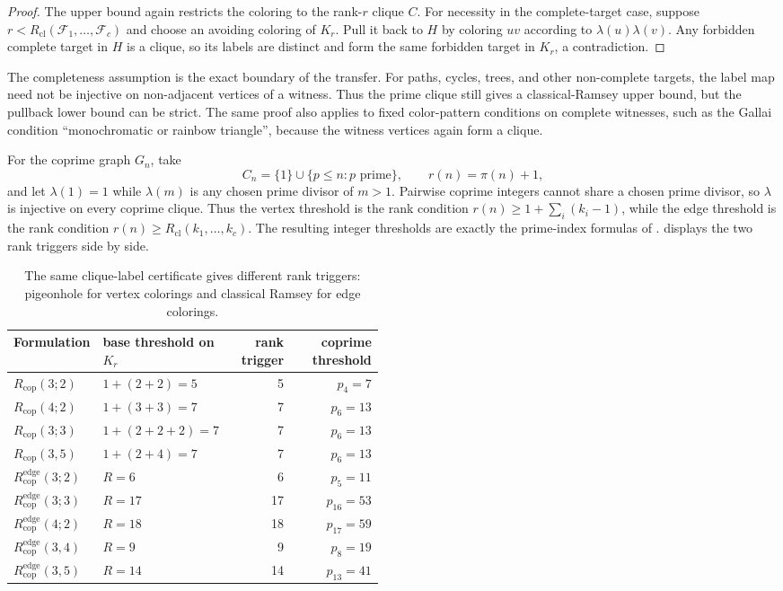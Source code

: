 \documentclass[11pt]{article}
\theoremstyle{plain}
\theoremstyle{definition}
\theoremstyle{remark}
\newcommand{\Rcop}{R_{\mathrm{cop}}}
\newcommand{\Redge}{R_{\mathrm{cop}}^{\mathrm{edge}}}
\newcommand{\Rcl}{R_{\mathrm{cl}}}
\begin{document}
\begin{proof}
The upper bound again restricts the coloring to the rank-$r$ clique $C$.
For necessity in the complete-target case, suppose
$r<R_{\mathrm{cl}}(\mathcal F_1,\ldots,\mathcal F_c)$ and choose an avoiding
coloring of $K_r$.  Pull it back to $H$ by coloring $uv$ according to
$\lambda(u)\lambda(v)$.  Any forbidden complete target in $H$ is a clique,
so its labels are distinct and form the same forbidden target in $K_r$,
a contradiction.
\end{proof}

The completeness assumption is the exact boundary of the transfer.  For
paths, cycles, trees, and other non-complete targets, the label map need not
be injective on non-adjacent vertices of a witness.  Thus the prime clique
still gives a classical-Ramsey upper bound, but the pullback lower bound can
be strict.  The same proof also applies to fixed color-pattern conditions on
complete witnesses, such as the Gallai condition ``monochromatic or rainbow
triangle'', because the witness vertices again form a clique.

For the coprime graph $G_n$, take
\[
  C_n=\{1\}\cup\{p\le n:p\text{ prime}\},\qquad r(n)=\pi(n)+1,
\]
and let $\lambda(1)=1$ while $\lambda(m)$ is any chosen prime divisor of
$m>1$.  Pairwise coprime integers cannot share a chosen prime divisor, so
$\lambda$ is injective on every coprime clique.  Thus the vertex threshold is
the rank condition $r(n)\ge 1+\sum_i(k_i-1)$, while the edge threshold is the
rank condition $r(n)\ge\Rcl(k_1,\ldots,k_c)$.  The resulting integer thresholds
are exactly the prime-index formulas of .
 displays the two rank triggers side by side.

\begin{table}[htbp]
\centering
\caption{The same clique-label certificate gives different rank triggers:
pigeonhole for vertex colorings and classical Ramsey for edge colorings.}
\label{tab:unified-rank-threshold}
\small
\begin{tabular}{@{}>{\raggedright\arraybackslash}p{0.22\linewidth}>{\raggedright\arraybackslash}p{0.26\linewidth}rr@{}}
\toprule
Formulation & base threshold on $K_r$ & rank trigger & coprime threshold \\
\midrule
$\Rcop(3;2)$ & $1+(2 + 2)=5$ & 5 & $p_{4}=7$ \\
$\Rcop(4;2)$ & $1+(3 + 3)=7$ & 7 & $p_{6}=13$ \\
$\Rcop(3;3)$ & $1+(2 + 2 + 2)=7$ & 7 & $p_{6}=13$ \\
$\Rcop(3,5)$ & $1+(2 + 4)=7$ & 7 & $p_{6}=13$ \\
$\Redge(3;2)$ & $R=6$ & 6 & $p_{5}=11$ \\
$\Redge(3;3)$ & $R=17$ & 17 & $p_{16}=53$ \\
$\Redge(4;2)$ & $R=18$ & 18 & $p_{17}=59$ \\
$\Redge(3,4)$ & $R=9$ & 9 & $p_{8}=19$ \\
$\Redge(3,5)$ & $R=14$ & 14 & $p_{13}=41$ \\
\bottomrule
\end{tabular}

\end{table}
\end{document}
